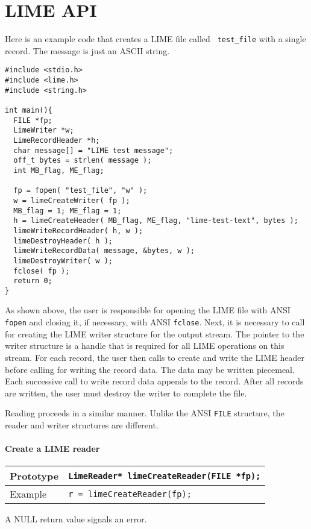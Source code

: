 \documentclass{article}
\begin{document}
\section{LIME API}

Here is an example code that creates a LIME file called {\tt
test\_file} with a single record.  The message is just an ASCII
string.

\begin{verbatim}
#include <stdio.h>
#include <lime.h>
#include <string.h>

int main(){
  FILE *fp;
  LimeWriter *w;
  LimeRecordHeader *h;
  char message[] = "LIME test message";
  off_t bytes = strlen( message );
  int MB_flag, ME_flag;

  fp = fopen( "test_file", "w" );
  w = limeCreateWriter( fp );
  MB_flag = 1; ME_flag = 1;
  h = limeCreateHeader( MB_flag, ME_flag, "lime-test-text", bytes );
  limeWriteRecordHeader( h, w );
  limeDestroyHeader( h );
  limeWriteRecordData( message, &bytes, w );
  limeDestroyWriter( w );
  fclose( fp );
  return 0;  
}
\end{verbatim}

As shown above, the user is responsible for opening the LIME file with
ANSI {\tt fopen} and closing it, if necessary, with ANSI {\tt fclose}.
Next, it is necessary to call for creating the LIME writer structure
for the output stream.  The pointer to the writer structure is a
handle that is required for all LIME operations on this stream.  For
each record, the user then calls to create and write the LIME header
before calling for writing the record data.  The data may be written
piecemeal.  Each successive call to write record data appends to the
record.  After all records are written, the user must destroy the
writer to complete the file.

Reading proceeds in a similar manner.  Unlike the ANSI {\tt FILE}
structure, the reader and writer structures are different.

\paragraph{Create a LIME reader}
%
\begin{flushleft}
  \begin{tabular}{|l|l|}
  \hline
  Prototype      & \verb|LimeReader* limeCreateReader(FILE *fp);| \\
\hline
  Example  & \verb|r = limeCreateReader(fp);| \\
   \hline
 \end{tabular}
\end{flushleft}
%
A NULL return value signals an error.
\end{document}

